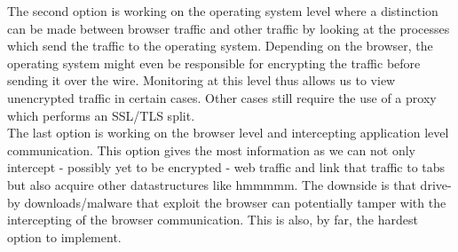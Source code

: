 The second option is working on the operating system level where a distinction can be made between browser traffic and other traffic by looking at the processes which send the traffic to the operating system. Depending on the browser, the operating system might even be responsible for encrypting the traffic before sending it over the wire. Monitoring at this level thus allows us to view unencrypted traffic in certain cases. Other cases still require the use of a proxy which performs an SSL/TLS split.\\%

The last option is working on the browser level and intercepting application level communication. This option gives the most information as we can not only intercept - possibly yet to be encrypted - web traffic and link that traffic to tabs but also acquire other datastructures like hmmmmm. The downside is that drive-by downloads/malware that exploit the browser can potentially tamper with the intercepting of the browser communication. This is also, by far, the hardest option to implement.

%
%
%
%
%
%
%


